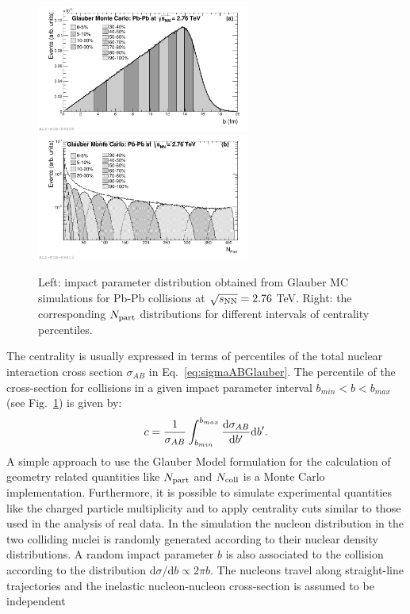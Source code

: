 \begin{figure}[!t]
\centering
\includegraphics[width=7cm]{FigCap1/Glauberimpactpar.pdf}
\includegraphics[width=7cm]{FigCap1/GlauberNpart.pdf}
\caption{Left: impact parameter distribution obtained from Glauber MC simulations for Pb-Pb collisions at $\sqrt{s_{\rm NN}} = 2.76$ TeV. Right: the corresponding $N_{\rm part}$ distributions for different intervals of centrality percentiles.}
\label{fig:glaubMC}
\end{figure}
The centrality is usually expressed in terms of percentiles of the total nuclear 
interaction cross section $\sigma_{AB}$ in Eq.~\ref{eq:sigmaABGlauber}.
The percentile of the cross-section for collisions in a given impact parameter
interval $b_{min}< b <b_{max}$ (see Fig.~\ref{fig:glaubMC}) is given by:
\begin{equation}
c=\frac{1}{\sigma_{AB}}\int_{b_{min}}^{b_{max}} \frac{{\rm d}\sigma_{AB}}{{\rm d}b'}{\rm d}b'.
\end{equation}
A simple approach to use the Glauber Model formulation for the
 calculation of geometry related quantities like $N_{\rm part}$ and $N_{\rm coll}$
is a Monte Carlo implementation. 
Furthermore, it is possible to simulate experimental quantities 
like the charged particle multiplicity and to apply centrality cuts similar to those used in the analysis of real data. 
In the simulation the nucleon distribution in the two colliding nuclei is randomly generated
according to their nuclear density distributions.
A random impact parameter $b$ is also associated to the collision according to the distribution
d$\sigma$/d$b \propto 2\pi b$. The nucleons travel along straight-line
trajectories and the inelastic nucleon-nucleon cross-section is assumed to be independent
